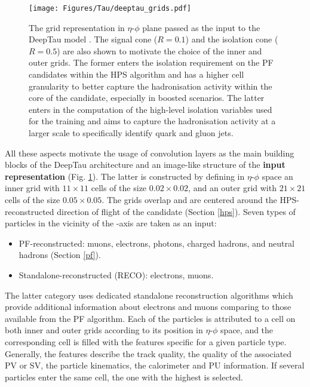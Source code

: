\begin{figure}[ht]
    \centering
    \texttt{[image: Figures/Tau/deeptau\_grids.pdf]}
    \caption{The grid representation in $\eta$-$\phi$ plane passed as the input to the DeepTau model \cite{CMS:2022prd}. The signal cone ($R = 0.1$) and the isolation cone ($R = 0.5$) are also shown to motivate the choice of the inner and outer grids. The former enters the isolation requirement on the PF candidates within the HPS algorithm and has a higher cell granularity to better capture the hadronisation activity within the core of the \tauh candidate, especially in boosted scenarios. The latter enters in the computation of the high-level isolation variables used for the training and aims to capture the hadronisation activity at a larger scale to specifically identify quark and gluon jets.}
    \label{fig:deeptau_grid}
\end{figure}

All these aspects motivate the usage of convolution layers as the main building blocks of the DeepTau architecture and an image-like structure of the \tauh \textbf{input representation} (Fig. \ref{fig:deeptau_grid}). The latter is constructed by defining in $\eta$-$\phi$ space an inner grid with $11\times11$ cells of the size $0.02\times0.02$, and an outer grid with $21\times21$ cells of the size $0.05 \times 0.05$. The grids overlap and are centered around the HPS-reconstructed direction of flight of the \tauh candidate (Section \ref{hps}). Seven types of particles in the vicinity of the \tauh-axis are taken as an input:

\begin{itemize}
    \item PF-reconstructed: muons, electrons, photons, charged hadrons, and neutral hadrons (Section \ref{pf}). 
    \item Standalone-reconstructed (RECO): electrons, muons.
\end{itemize}

The latter category uses dedicated standalone reconstruction algorithms which provide additional information about electrons and muons comparing to those available from the PF algorithm. Each of the particles is attributed to a cell on both inner and outer grids according to its position in $\eta$-$\phi$ space, and the corresponding cell is filled with the features specific for a given particle type. Generally, the features describe the track quality, the quality of the associated PV or SV, the particle kinematics, the calorimeter and PU information. If several particles enter the same cell, the one with the highest \pt is selected. 

